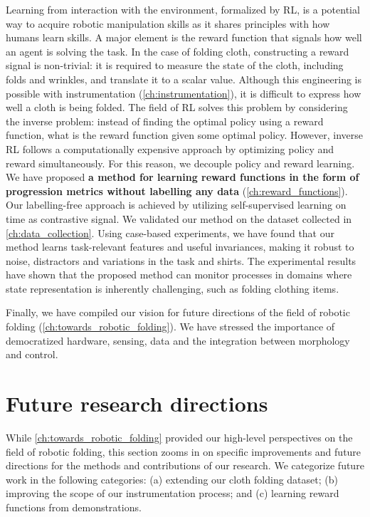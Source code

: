 \documentclass[\home/main.tex]{subfiles}
\begin{document}
Learning from interaction with the environment, formalized by RL, is a potential way to acquire robotic manipulation skills as it shares principles with how humans learn skills. A major element is the reward function that signals how well an agent is solving the task. In the case of folding cloth, constructing a reward signal is non-trivial: it is required to measure the state of the cloth, including folds and wrinkles, and translate it to a scalar value. Although this engineering is possible with instrumentation (\cref{ch:instrumentation}), it is difficult to express how well a cloth is being folded. The field of RL solves this problem by considering the inverse problem: instead of finding the optimal policy using a reward function, what is the reward function given some optimal policy. However, inverse RL follows a computationally expensive approach by optimizing policy and reward simultaneously. For this reason, we decouple policy and reward learning. We have proposed \textbf{a method for learning reward functions in the form of progression metrics without labelling any data} (\cref{ch:reward_functions}). Our labelling-free approach is achieved by utilizing self-supervised learning on time as contrastive signal. We validated our method on the dataset collected in \cref{ch:data_collection}. Using case-based experiments, we have found that our method learns task-relevant features and useful invariances, making it robust to noise, distractors and variations in the task and shirts. The experimental results have shown that the proposed method can monitor processes in domains where state representation is inherently challenging, such as folding clothing items.

Finally, we have compiled our vision for future directions of the field of robotic folding (\cref{ch:towards_robotic_folding}). We have stressed the importance of democratized hardware, sensing, data and the integration between morphology and control.

\section{Future research directions} \label{sec:conc_future_work}
While \cref{ch:towards_robotic_folding} provided our high-level perspectives on the field of robotic folding,
this section zooms in on specific improvements and future directions for the methods and contributions of our research. We categorize future work in the following categories:
(a) extending our cloth folding dataset;
(b) improving the scope of our instrumentation process; and
(c) learning reward functions from demonstrations.
\end{document}
